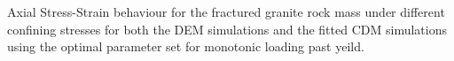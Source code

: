 \label{fig:fitted1} Axial Stress-Strain behaviour for the fractured granite rock mass under different confining stresses for both the DEM simulations and the fitted CDM simulations using the optimal parameter set for monotonic loading past yeild.